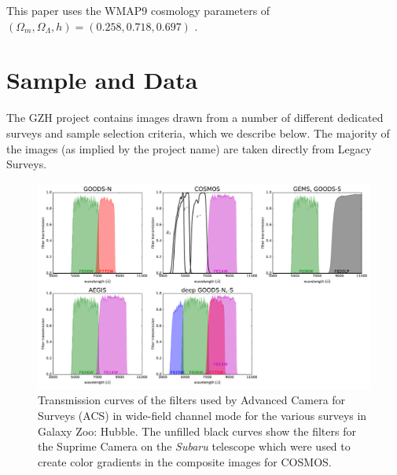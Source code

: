 \documentclass[twocolumn]{aastex6}
\begin{document}
This paper uses the WMAP9 cosmology parameters of $(\Omega_m,\Omega_\Lambda,h)=(0.258,0.718,0.697)$ \citep{hin13}.


\section{Sample and Data}\label{sec:data}

The GZH project contains images drawn from a number of different dedicated surveys and sample selection criteria, which we describe below. The majority of the images (as implied by the project name) are taken directly from \hst{} Legacy Surveys.

\begin{figure}
\center
\includegraphics[width=160mm]{figures/filter_curves.pdf}
\caption{Transmission curves of the filters used by \hst{} Advanced Camera for Surveys (ACS) in wide-field channel mode for the various surveys in Galaxy Zoo: Hubble. The unfilled black curves show the filters for the Suprime Camera on the \textit{Subaru} telescope which were used to create color gradients in the composite images for COSMOS.\label{fig:filtercurves}}
\end{figure}
\end{document}
